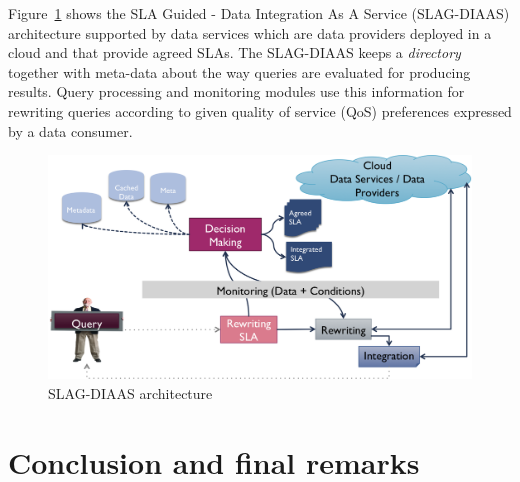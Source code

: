 \documentclass{llncs}
\begin{document}
Figure~\ref{fig_sim} shows the SLA Guided - Data Integration As A Service (SLAG-DIAAS) architecture  supported by data services which are data providers deployed in a cloud and that provide agreed SLAs. 
The SLAG-DIAAS keeps a \textit{directory} together with meta-data about the way queries are evaluated for producing results.
Query processing and monitoring modules use this information for rewriting queries according to given quality of service (QoS) preferences expressed by a data consumer.
\begin{figure}[!t]
\centering
\includegraphics[width=5in]{figs/arch}
\caption{SLAG-DIAAS architecture}
\label{fig_sim}
\end{figure}




\section{Conclusion and final remarks}\label{sec:conc}



\end{document}
